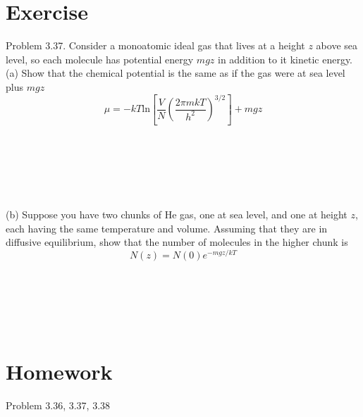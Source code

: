 \section{Exercise}
Problem 3.37. Consider a monoatomic ideal gas that lives at a height $z$ above sea level, so each molecule has potential energy $mgz$ 
in addition to it kinetic energy.\\
(a) Show that the chemical potential is the same as if the gas were at sea level plus $mgz$
\begin{equation}
  \mu  = -kT\text{ln}[\frac{V}{N} (\frac{2{\pi} mkT} {h^2})^{3/2} ] + mgz
\end{equation}
\\\\\\\\\\\\





(b) Suppose you have two chunks of He gas, one at sea level, and one at height $z$, each having the same temperature and volume.
Assuming that they are in diffusive equilibrium, show that the number of molecules in the higher chunk is
\begin{equation}
  N(z)  = N(0)e^{-mgz/kT}
\end{equation}
\\\\\\\\\\


\section{Homework}
Problem 3.36, 3.37, 3.38

